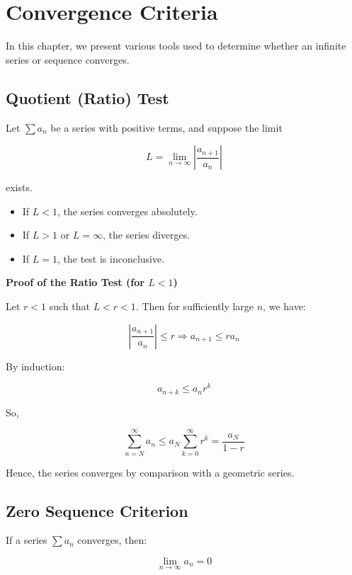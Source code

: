 \chapter{Convergence Criteria}

In this chapter, we present various tools used to determine whether an infinite series or sequence converges.

\section{Quotient (Ratio) Test}

Let \(\sum a_n\) be a series with positive terms, and suppose the limit

\[
  L = \lim_{n \to \infty} \left| \frac{a_{n+1}}{a_n} \right|
\]

exists.

\begin{itemize}
  
  \item If \(L < 1\), the series converges absolutely.

  \item If \(L > 1\) or \(L = \infty\), the series diverges.

  \item If \(L = 1\), the test is inconclusive.

\end{itemize}

\textbf{Proof of the Ratio Test (for \(L < 1\))}

Let \(r < 1\) such that \(L < r < 1\). Then for sufficiently large \(n\), we have:

\[
    \left| \frac{a_{n+1}}{a_n} \right| \le r \Rightarrow a_{n+1} \le r a_n
\]

By induction:

\[
    a_{n+k} \le a_n r^k
\]

So,

\[
    \sum_{n=N}^\infty a_n \le a_N \sum_{k=0}^\infty r^k = \frac{a_N}{1 - r}
\]

Hence, the series converges by comparison with a geometric series.

\section{Zero Sequence Criterion}

If a series \(\sum a_n\) converges, then:

\[
    \lim_{n \to \infty} a_n = 0
\]


